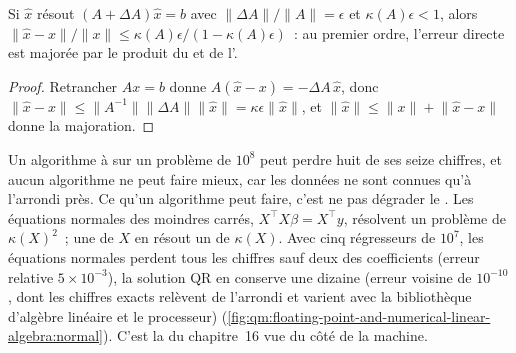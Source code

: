 \begin{proposition}\label{prop:qm:floating-point-and-numerical-linear-algebra:fwd}
Si $\hat x$ résout $(A + \Delta A)\hat x = b$ avec $\lVert\Delta A\rVert/\lVert A\rVert = \epsilon$ et $\kappa(A)\epsilon < 1$, alors $\lVert\hat x - x\rVert/\lVert x\rVert \le \kappa(A)\epsilon/(1 - \kappa(A)\epsilon)$~:
au premier ordre, l'erreur directe est majorée par le produit du  et de l'.
\end{proposition}

\begin{proof}
Retrancher $Ax = b$ donne $A(\hat x - x) = -\Delta A\,\hat x$, donc $\lVert\hat x - x\rVert \le \lVert A^{-1}\rVert\lVert\Delta A\rVert\lVert\hat x\rVert = \kappa\epsilon\lVert\hat x\rVert$, et $\lVert\hat x\rVert \le
\lVert x\rVert + \lVert\hat x - x\rVert$ donne la majoration.
\end{proof}

Un algorithme à  sur un problème de  $10^8$ peut perdre huit de ses seize chiffres,
et aucun algorithme ne peut faire mieux, car les données ne sont connues qu'à l'arrondi près. Ce qu'un algorithme peut faire, c'est ne pas dégrader le . Les équations normales des moindres carrés,
$X^\top X\beta = X^\top y$, résolvent un problème de  $\kappa(X)^2$~; une  de $X$ en résout un de  $\kappa(X)$. Avec cinq régresseurs de  $10^7$, les
équations normales perdent tous les chiffres sauf deux des coefficients (erreur relative $5 \times 10^{-3}$), la solution QR en conserve une dizaine (erreur voisine de $10^{-10}$, dont les chiffres exacts relèvent de l'arrondi et varient
avec la bibliothèque d'algèbre linéaire et le processeur)
(\cref{fig:qm:floating-point-and-numerical-linear-algebra:normal}). C'est la  du chapitre~16 vue du côté de la machine.

